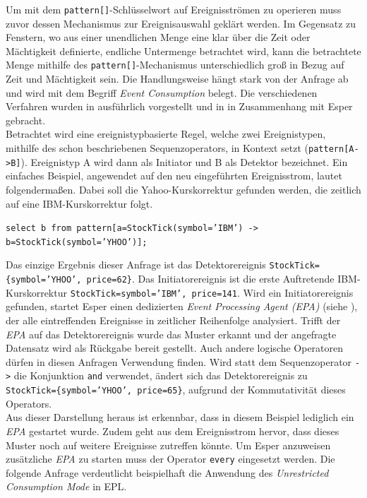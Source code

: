 \documentclass{acm_proc_article-sp}
\begin{document}
Um mit dem \texttt{pattern[]}-Schlüsselwort auf Ereignisströmen zu operieren muss zuvor 
dessen Mechanismus zur Ereignisauswahl geklärt werden. Im Gegensatz zu Fenstern, wo aus 
einer unendlichen Menge eine klar über die Zeit oder Mächtigkeit definierte, endliche 
Untermenge betrachtet wird, kann die betrachtete Menge mithilfe des 
\texttt{pattern[]}-Mechanismus unterschiedlich groß in Bezug auf Zeit und Mächtigkeit 
sein. Die Handlungsweise hängt stark von der Anfrage ab und wird mit dem Begriff  
\textit{Event Consumption} belegt. Die verschiedenen Verfahren wurden in 
\cite{adaikkalavan} ausführlich vorgestellt und in \cite{hedtstuck} in Zusammenhang mit 
Esper gebracht.\\
Betrachtet wird eine ereignistypbasierte Regel, welche zwei Ereignistypen, 
mithilfe des schon beschriebenen Sequenzoperators, in Kontext setzt 
(\texttt{pattern[A->B]}). Ereignistyp A wird dann als Initiator und B als Detektor 
bezeichnet. Ein einfaches Beispiel, angewendet auf den neu eingeführten Ereignisstrom, 
lautet folgendermaßen. Dabei soll die Yahoo-Kurskorrektur gefunden werden, die zeitlich 
auf eine IBM-Kurskorrektur folgt.

\texttt{select b from pattern[a=StockTick(symbol='IBM') ->\\ 
b=StockTick(symbol='YHOO')];}

Das einzige Ergebnis dieser Anfrage ist das Detektorereignis 
\texttt{StockTick=\{symbol='YHOO', price=62\}}. Das Initiatorereignis ist die erste 
Auftretende IBM-Kurskorrektur \texttt{StockTick={symbol='IBM', price=141}}. Wird ein 
Initiatorereignis gefunden, startet Esper einen dedizierten \textit{Event Processing 
Agent (EPA)} (siehe \cite{bruns}), der alle eintreffenden Ereignisse in zeitlicher 
Reihenfolge analysiert. Trifft der \textit{EPA} auf das Detektorereignis wurde das Muster 
erkannt und der angefragte Datensatz wird als Rückgabe bereit gestellt. Auch andere 
logische Operatoren dürfen in diesen Anfragen Verwendung finden. Wird statt dem 
Sequenzoperator \texttt{->} die Konjunktion \texttt{and} verwendet, ändert sich das 
Detektorereignis zu \texttt{StockTick=\{symbol='YHOO', price=65\}}, aufgrund der 
Kommutativität dieses Operators.\\
Aus dieser Darstellung heraus ist erkennbar, dass in diesem Beispiel lediglich ein 
\textit{EPA} gestartet wurde. Zudem geht aus dem Ereignisstrom hervor, dass dieses Muster 
noch auf weitere Ereignisse zutreffen könnte. Um Esper anzuweisen zusätzliche 
\textit{EPA} zu starten muss der Operator \texttt{every} eingesetzt werden. Die folgende 
Anfrage verdeutlicht beispielhaft die Anwendung des 
\textit{Unrestricted Consumption Mode} in EPL.
\end{document}
